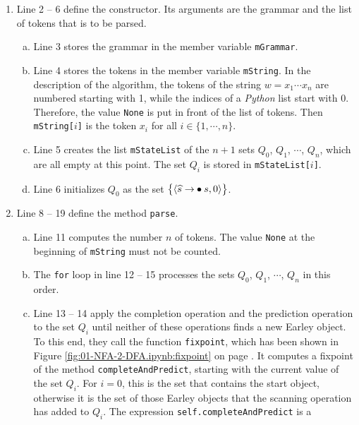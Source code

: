 \begin{enumerate}
\item Line 2 -- 6 define the constructor.  Its arguments are the grammar and the list of tokens that is to be
      parsed.
      \begin{enumerate}[(a)]
      \item Line 3 stores the grammar in the member variable \texttt{mGrammar}.
      \item Line 4 stores the tokens in the member variable \texttt{mString}.  In the description of the algorithm,
            the tokens of the string $w = x_1 \cdots x_n$ are numbered starting with 1, while the indices of a
            \textsl{Python} list start with 0.  Therefore, the value \texttt{None} is put in front of the list of
            tokens.  Then \texttt{mString[$i$]} is the token $x_i$ for all $i \in \{1, \cdots, n\}$.
      \item Line 5 creates the list \texttt{mStateList} of the $n+1$ sets $Q_0$, $Q_1$, $\cdots$, $Q_n$, which are
            all empty at this point.  The set $Q_i$ is stored in \texttt{mStateList[$i$]}.
      \item Line 6 initializes $Q_0$ as the set $\bigl\{ \pair(\widehat{s} \rightarrow \mdot s, 0) \bigr\}$.
      \end{enumerate}
\item Line 8 -- 19 define the method \texttt{parse}.
      \begin{enumerate}[(a)]
      \item Line 11 computes the number $n$ of tokens.  The value \texttt{None} at the beginning of
            \texttt{mString} must not be counted.
      \item The \texttt{for} loop in line 12 -- 15 processes the sets $Q_0$, $Q_1$, $\cdots$, $Q_n$ in this order.
      \item Line 13 -- 14 apply the completion operation and the prediction operation to the set $Q_i$ until
            neither of these operations finds a new Earley object.  To this end, they call the function
            \texttt{fixpoint}, which has been shown in Figure \ref{fig:01-NFA-2-DFA.ipynb:fixpoint} on page
            \pageref{fig:01-NFA-2-DFA.ipynb:fixpoint}.  It computes a fixpoint of the method
            \texttt{completeAndPredict}, starting with the current value of the set $Q_i$.  For $i = 0$, this is
            the set that contains the start object, otherwise it is the set of those Earley objects that the
            scanning operation has added to $Q_i$.  The expression \texttt{self.completeAndPredict} is a

\end{enumerate}
\end{enumerate}
